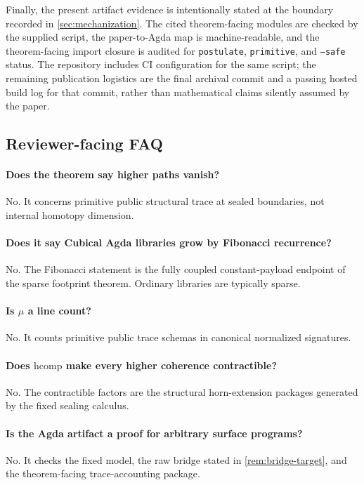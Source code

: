 \documentclass{lmcs}
\newcommand{\hcomp}{\mathrm{hcomp}}
\begin{document}
Finally, the present artifact evidence is intentionally stated at the boundary
recorded in \autoref{sec:mechanization}. The cited theorem-facing modules are
checked by the supplied script, the paper-to-Agda map is machine-readable, and
the theorem-facing import closure is audited for \texttt{postulate},
\texttt{primitive}, and \texttt{--safe} status. The repository includes CI
configuration for the same script; the remaining publication logistics are the
final archival commit and a passing hosted build log for that commit, rather
than mathematical claims silently assumed by the paper.

\subsection{Reviewer-facing FAQ}
\label{subsec:faq}

\paragraph{Does the theorem say higher paths vanish?}
No. It concerns primitive public structural trace at sealed boundaries, not
internal homotopy dimension.

\paragraph{Does it say Cubical Agda libraries grow by Fibonacci recurrence?}
No. The Fibonacci statement is the fully coupled constant-payload endpoint of
the sparse footprint theorem. Ordinary libraries are typically sparse.

\paragraph{Is $\mu$ a line count?}
No. It counts primitive public trace schemas in canonical normalized
signatures.

\paragraph{Does $\hcomp$ make every higher coherence contractible?}
No. The contractible factors are the structural horn-extension packages
generated by the fixed sealing calculus.

\paragraph{Is the Agda artifact a proof for arbitrary surface programs?}
No. It checks the fixed model, the raw bridge stated in
\autoref{rem:bridge-target}, and the theorem-facing trace-accounting package.
\end{document}

